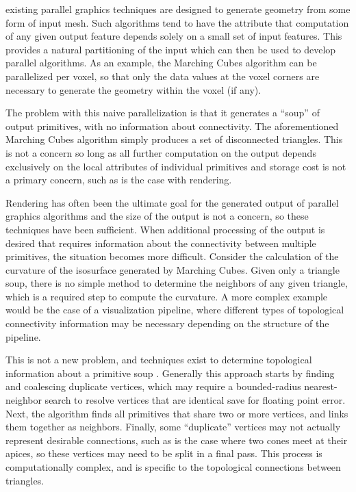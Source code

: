\documentclass[10pt,journal,cspaper,compsoc]{IEEEtran}
\begin{document}
% 
% 
% 
% 
 existing parallel graphics techniques are designed to generate geometry from
some form of input mesh. Such algorithms tend to have the attribute that
computation of any given output feature depends solely on a small set
of input features. This provides a natural partitioning of the input
which can then be used to develop parallel algorithms. As an example,
the Marching Cubes \cite{Lorensen1987} algorithm can be parallelized per voxel, so that only
the data values at the voxel corners are necessary to generate the geometry
within the voxel (if any).

The problem with this naive parallelization is that it generates a
``soup'' of output primitives, with no information about connectivity.
The aforementioned Marching Cubes algorithm simply produces a set of disconnected triangles.
This is not a concern so long as all further computation on the output
depends exclusively on the local attributes of individual primitives and storage cost is not a primary concern, such as is
the case with rendering. 

Rendering has often been the ultimate goal for the
generated output of parallel graphics algorithms and the size of the output is not a concern, so these techniques have been sufficient. When
additional processing of the output is desired that requires information about the connectivity 
between multiple primitives, the situation becomes more difficult. Consider the calculation of 
the curvature of the isosurface generated by Marching Cubes.
Given only a triangle soup, there is no simple method to determine the neighbors of any given triangle, which is a required step to 
compute the curvature. A more complex example would be the case of a visualization pipeline,
where different types of topological connectivity information may be necessary depending
on the structure of the pipeline.

This is not a new problem, and techniques exist to determine topological
information about a primitive soup \cite{Park}. Generally this approach starts by finding 
and coalescing duplicate vertices, which may require a bounded-radius nearest-neighbor search to 
resolve vertices that are identical save for floating point error. Next, the algorithm finds all primitives that 
share two or more vertices, and links them together as neighbors. Finally,
some ``duplicate'' vertices may not actually represent desirable connections,
such as is the case where two cones meet at their apices, so these vertices
may need to be split in a final pass. This process is computationally complex, and is
specific to the topological connections between triangles. 
\end{document}
